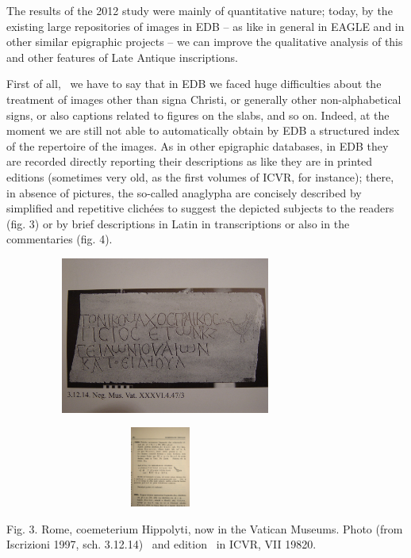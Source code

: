 \documentclass[amsthm,ebook]{saparticle}
\begin{document}
The results of the 2012 study were mainly of quantitative nature; today, by the existing large repositories of images in
EDB – as like in general in EAGLE and in other similar epigraphic projects – we can improve the qualitative analysis of
this and other features of Late Antique inscriptions.

First of all, \ we have to say that in EDB we faced huge difficulties about the treatment of images other than signa
Christi, or generally other non-alphabetical signs, or also captions related to figures on the slabs, and so on.
Indeed, at the moment we are still not able to automatically obtain by EDB a structured index of the repertoire of the
images. As in other epigraphic databases, in EDB they are recorded directly reporting their descriptions as like they
are in printed editions (sometimes very old, as the first volumes of ICVR, for instance); there, in absence of
pictures, the so-called anaglypha are concisely described by simplified and repetitive clichées to suggest the depicted
subjects to the readers (fig. 3) or by brief descriptions in Latin in transcriptions or also in the commentaries (fig.
4). 


\bigskip


\bigskip

 \includegraphics[width=10.59cm,height=5.159cm]{FelleVisualFeaturesofinscriptionsEAGLE2016FullPaper-img002.jpg} 


\bigskip

 \includegraphics[width=10.268cm,height=2.639cm]{FelleVisualFeaturesofinscriptionsEAGLE2016FullPaper-img003.png} 

Fig. 3. Rome, coemeterium Hippolyti, now in the Vatican Museums. Photo (from Iscrizioni 1997, sch. 3.12.14) \ and
edition \ in ICVR, VII 19820.
\end{document}

